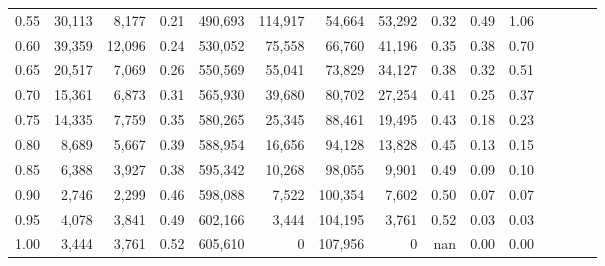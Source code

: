 \begin{tabular}{rrrcrrrrrrrrrrr}
0.55 &  30,113 &   8,177 &                                       0.21 &  490,693 &  114,917 &   54,664 &   53,292 &  0.32 &  0.49 &                         1.06 \\
0.60 &  39,359 &  12,096 &                                       0.24 &  530,052 &   75,558 &   66,760 &   41,196 &  0.35 &  0.38 &                         0.70 \\
0.65 &  20,517 &   7,069 &                                       0.26 &  550,569 &   55,041 &   73,829 &   34,127 &  0.38 &  0.32 &                         0.51 \\
0.70 &  15,361 &   6,873 &                                       0.31 &  565,930 &   39,680 &   80,702 &   27,254 &  0.41 &  0.25 &                         0.37 \\
0.75 &  14,335 &   7,759 &                                       0.35 &  580,265 &   25,345 &   88,461 &   19,495 &  0.43 &  0.18 &                         0.23 \\
0.80 &   8,689 &   5,667 &                                       0.39 &  588,954 &   16,656 &   94,128 &   13,828 &  0.45 &  0.13 &                         0.15 \\
0.85 &   6,388 &   3,927 &                                       0.38 &  595,342 &   10,268 &   98,055 &    9,901 &  0.49 &  0.09 &                         0.10 \\
0.90 &   2,746 &   2,299 &                                       0.46 &  598,088 &    7,522 &  100,354 &    7,602 &  0.50 &  0.07 &                         0.07 \\
0.95 &   4,078 &   3,841 &                                       0.49 &  602,166 &    3,444 &  104,195 &    3,761 &  0.52 &  0.03 &                         0.03 \\
1.00 &   3,444 &   3,761 &                                       0.52 &  605,610 &        0 &  107,956 &        0 &   nan &  0.00 &                         0.00 \\
\bottomrule
\end{tabular}
